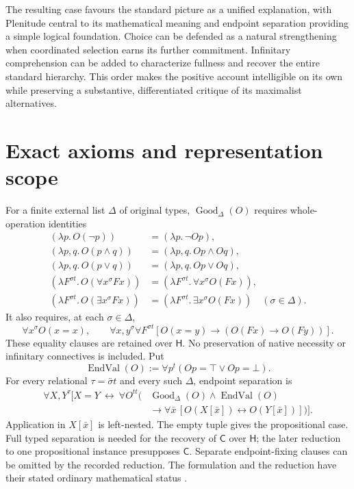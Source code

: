 \documentclass[12pt,letterpaper]{article}
\newcommand{\styledappendices}{%
  \appendix
  \renewcommand{\thesection}{Appendix~\Alph{section}}%
  \addtocontents{toc}{\protect\setlength{\protect\cftsecnumwidth}{6em}}%
}
\newcommand{\Hlogic}{\mathsf H}
\newcommand{\C}{\mathsf C}
\newcommand{\Good}{\operatorname{Good}}
\newcommand{\EndVal}{\operatorname{EndVal}}
\begin{document}
The resulting case favours the standard picture as a unified explanation, with Plenitude central to its mathematical meaning and endpoint separation providing a simple logical foundation. Choice can be defended as a natural strengthening when coordinated selection earns its further commitment. Infinitary comprehension can be added to characterize fullness and recover the entire standard hierarchy. This order makes the positive account intelligible on its own while preserving a substantive, differentiated critique of its maximalist alternatives.

\styledappendices
\section{Exact axioms and representation scope}\label{app:axioms}

For a finite external list $\Delta$ of original types, $\Good_\Delta(O)$ requires whole-operation identities
\begin{align*}
 (\lambda p.\,O(\neg p))&=(\lambda p.\,\neg Op),\\
 (\lambda p,q.\,O(p\land q))&=(\lambda p,q.\,Op\land Oq),\\
 (\lambda p,q.\,O(p\lor q))&=(\lambda p,q.\,Op\lor Oq),\\
 (\lambda F^{\sigma t}.\,O(\forall x^\sigma Fx))
   &=(\lambda F^{\sigma t}.\,\forall x^\sigma O(Fx)),\\
 (\lambda F^{\sigma t}.\,O(\exists x^\sigma Fx))
   &=(\lambda F^{\sigma t}.\,\exists x^\sigma O(Fx))
       \quad(\sigma\in\Delta).
\end{align*}
It also requires, at each $\sigma\in\Delta$,
\[
 \forall x^\sigma O(x=x),\qquad
 \forall x,y^\sigma\forall F^{\sigma t}
 [O(x=y)\to(O(Fx)\to O(Fy))].
\]
These equality clauses are retained over $\Hlogic$. No preservation of native necessity or infinitary connectives is included. Put
\[
 \EndVal(O):=\forall p^t(Op=\top\lor Op=\bot).
\]
For every relational $\tau=\bar\sigma t$ and every such $\Delta$, endpoint separation is
\[
 \begin{aligned}
 \forall X,Y^\tau\bigl[X=Y\ \leftrightarrow\ \forall O^{tt}\bigl(&\Good_\Delta(O)\land\EndVal(O)\\[-2pt]
 &\to\forall\bar x\,
  [O(X[\bar x])\leftrightarrow O(Y[\bar x])]\bigr)\bigr].
 \end{aligned}
\]
Application in $X[\bar x]$ is left-nested. The empty tuple gives the propositional case. Full typed separation is needed for the recovery of $\C$ over $\Hlogic$; the later reduction to one propositional instance presupposes $\C$. Separate endpoint-fixing clauses can be omitted by the recorded reduction. The formulation and the reduction have their stated ordinary mathematical status \citep[\S\S1--3]{observers}.
\end{document}
